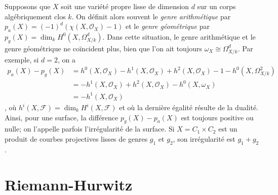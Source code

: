\begin{remark}
\label{remark-genus-higher-dimension}
Supposons que $X$ soit une variété propre lisse de dimension $d$ sur un corps algébriquement clos $k$. On définit alors souvent le {\it genre arithmétique} par $p_a(X) = (-1)^d(\chi(X, \mathcal{O}_X) - 1)$ et le {\it genre géométrique} par $p_g(X) = \dim_k H^0(X, \Omega^d_{X/k})$. Dans cette situation, le genre arithmétique et le genre géométrique ne coïncident plus, bien que l'on ait toujours $\omega_X \cong \Omega_{X/k}^d$. Par exemple, si $d = 2$, on a \begin{align*}
p_a(X) - p_g(X) & =
h^0(X, \mathcal{O}_X) - h^1(X, \mathcal{O}_X) + h^2(X, \mathcal{O}_X) - 1
- h^0(X, \Omega^2_{X/k}) \\
& =
- h^1(X, \mathcal{O}_X) + h^2(X, \mathcal{O}_X) - h^0(X, \omega_X) \\
& =
- h^1(X, \mathcal{O}_X)
\end{align*}, où $h^i(X, \mathcal{F}) = \dim_k H^i(X, \mathcal{F})$ et où la dernière égalité résulte de la dualité. Ainsi, pour une surface, la différence $p_g(X) - p_a(X)$ est toujours positive ou nulle; on l'appelle parfois l'irrégularité de la surface. Si $X = C_1 \times C_2$ est un produit de courbes projectives lisses de genres $g_1$ et $g_2$, son irrégularité est $g_1 + g_2$.
\end{remark}






\section{Riemann-Hurwitz}
\label{section-riemann-hurewitz}

